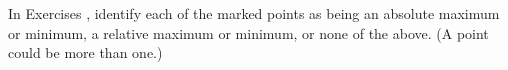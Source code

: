 {\noindent In Exercises}
{, identify each of the marked points as being an absolute maximum or minimum, a relative maximum or minimum, or none of the above. (A point could be more than one.)}
